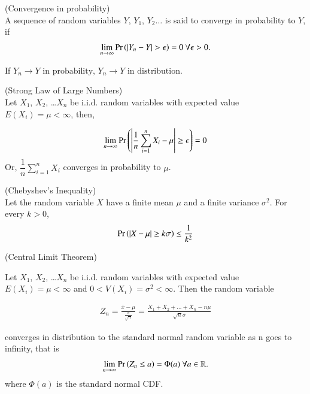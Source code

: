 \documentclass[journal,12pt,twocolumn]{IEEEtran}
\begin{document}
\begin{definition}
    (Convergence in probability)\\
    A sequence of random variables $Y$, $Y_1$, $Y_2 \ldots$ is said to converge in probability to $Y$, if
    \begin{align}
        \lim_{n \to \infty}\Pr\left(\vert Y_n - Y\vert > \epsilon\right) = 0  \text{  }\forall \epsilon > 0.
    \end{align}
\end{definition}

\begin{lemma}\label{lma1}
    If
    \begin{math}
    {Y_n} \to Y \text{ in probability, }{Y_n} \to Y \text{ in distribution.}
    \end{math}
\end{lemma}


\begin{lemma}\label{lma3}
    (Strong Law of Large Numbers)\\ 
Let $X_1$, $X_2$, \ldots $X_n$ be i.i.d. random variables with expected value $E(X_i)=\mu < \infty$, then,

\begin{align}
    \lim_{n \to \infty}\Pr\left(\left|\dfrac{1}{n}\sum_{i=1}^n X_i - \mu \right|\geq \epsilon\right)=0
\end{align}
Or, 
\begin{math}
    \dfrac{1}{n}\sum_{i=1}^n X_i
\end{math}
converges in probability to $\mu$.
\end{lemma}

\begin{lemma}\label{lma4}
    (Chebyshev's Inequality)\\
Let the random variable $X$ have a finite mean $\mu$ and a finite variance $\sigma^2$. For every $k>0$, 
\begin{align}
    \Pr\left(\vert X - \mu\vert \geq k\sigma\right) \leq \frac{1}{k^2}
\end{align}
\end{lemma}

\begin{lemma}\label{lma2}
    (Central Limit Theorem)

Let $X_1$, $X_2$, \ldots $X_n$ be i.i.d. random variables with expected value $E(X_i)=\mu < \infty$  and $0 < V(X_i)=\sigma^2 < \infty$. Then the random variable 

\begin{align}
    Z_n = \frac{\bar{x} - \mu}{\frac{\sigma}{\sqrt{n}}} = \frac{X_1 + X_2 + \ldots + X_n - n\mu}{\sqrt{n}\sigma}
\end{align}

converges in distribution to the standard normal random variable as n goes to infinity, that is
\begin{align}
    \lim_{n \to \infty}\Pr\left(Z_n \leq a\right) = \Phi(a)   \text{        }\forall a \in \mathbb{R}.
\end{align}
where $\Phi(a)$ is the standard normal CDF.
\end{lemma}
\end{document}
